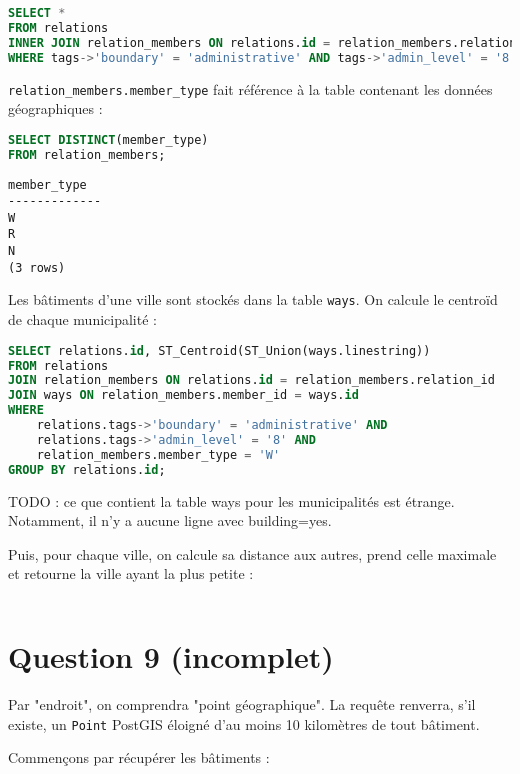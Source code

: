 \documentclass[12pt]{article}
\begin{document}
\begin{lstlisting}[language=SQL]
SELECT *
FROM relations
INNER JOIN relation_members ON relations.id = relation_members.relation_id
WHERE tags->'boundary' = 'administrative' AND tags->'admin_level' = '8';
\end{lstlisting}

\verb?relation_members.member_type? fait référence à la table contenant les données
géographiques :

\begin{lstlisting}[language=SQL]
SELECT DISTINCT(member_type)
FROM relation_members;
\end{lstlisting}

\begin{lstlisting}
member_type 
-------------
W
R
N
(3 rows)
\end{lstlisting}

Les bâtiments d'une ville sont stockés dans la table \verb?ways?. On calcule le centroïd
de chaque municipalité :

\begin{lstlisting}[language=SQL]
SELECT relations.id, ST_Centroid(ST_Union(ways.linestring))
FROM relations
JOIN relation_members ON relations.id = relation_members.relation_id
JOIN ways ON relation_members.member_id = ways.id
WHERE
    relations.tags->'boundary' = 'administrative' AND
    relations.tags->'admin_level' = '8' AND
    relation_members.member_type = 'W'
GROUP BY relations.id;
\end{lstlisting}

TODO : ce que contient la table ways pour les municipalités est étrange. Notamment,
il n'y a aucune ligne avec building=yes.

Puis, pour chaque ville, on calcule sa distance aux autres, prend celle maximale
et retourne la ville ayant la plus petite :

\begin{lstlisting}[language=SQL]
\end{lstlisting}

\newpage

\section*{Question 9 (incomplet)}

Par "endroit", on comprendra "point géographique". La requête renverra, s'il
existe, un \verb?Point? PostGIS éloigné d'au moins 10 kilomètres de tout bâtiment.

Commençons par récupérer les bâtiments :
\end{document}
